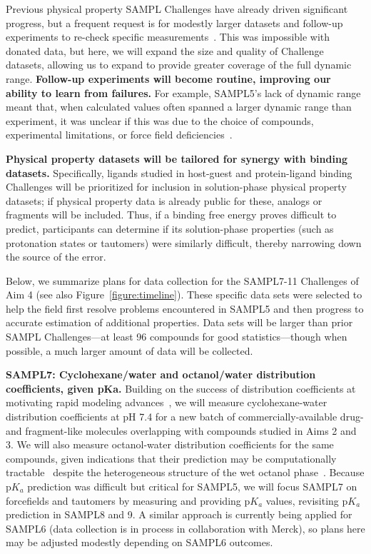 \documentclass[11pt]{article}
\begin{document}
Previous physical property SAMPL Challenges have already driven significant progress, but a frequent request is for modestly larger datasets and follow-up experiments to re-check specific measurements~\cite{Mobley:2017:eScholarship}. 
This was impossible with donated data, but here, we will expand the size and quality of Challenge datasets, allowing us to expand to provide greater coverage of the full dynamic range. 
\textbf{Follow-up experiments will become routine, improving our ability to learn from failures.}
For example, SAMPL5's lack of dynamic range meant that, when calculated values often spanned a larger dynamic range than experiment, it was unclear if this was due to the choice of compounds, experimental limitations, or force field deficiencies~\cite{rustenburg_measuring_2016, Bannan:2016:JComputAidedMolDes, paranahewage_predicting_2016, klamt_prediction_2016}.  

{\bf Physical property datasets will be tailored for synergy with binding datasets.}
Specifically, ligands studied in host-guest and protein-ligand binding Challenges will be prioritized for inclusion in solution-phase physical property datasets; if physical property data is already public for these, analogs or fragments will be included. 
Thus, if a binding free energy proves difficult to predict, participants can determine if its solution-phase properties (such as protonation states or tautomers) were similarly difficult, thereby narrowing down the source of the error.

Below, we summarize plans for data collection for the SAMPL7-11 Challenges of Aim 4 (see also Figure~\ref{figure:timeline}).
These specific data sets were selected to help the field first resolve problems encountered in SAMPL5 and then progress to accurate estimation of additional properties.
Data sets will be larger than prior SAMPL Challenges---at least 96 compounds for good statistics---though when possible, a much larger amount of data will be collected.

\textbf{SAMPL7: Cyclohexane/water and octanol/water distribution coefficients, given pKa.}
Building on the success of distribution coefficients at motivating rapid modeling advances~\cite{Bannan:2016:JComputAidedMolDes}, we will measure cyclohexane-water distribution coefficients at pH 7.4 for a new batch of commercially-available drug- and fragment-like molecules overlapping with compounds studied in Aims 2 and 3.
We will also measure octanol-water distribution coefficients for the same compounds, given indications that their prediction may be computationally tractable~\cite{Bhatnagar:2013:PhysicalChemistryChemicalPhysics, bannan_calculating_2016} despite the heterogeneous structure of the wet octanol phase~\cite{Kollman:1996:AccountsofChemicalResearch}.
Because p$K_a$ prediction was difficult but critical for SAMPL5, we will focus SAMPL7 on forcefields and tautomers by measuring and providing p$K_a$ values, revisiting p$K_a$ prediction in SAMPL8 and 9.
A similar approach is currently being applied for SAMPL6 (data collection is in process in collaboration with Merck), so plans here may be adjusted modestly depending on SAMPL6 outcomes.
\end{document}
